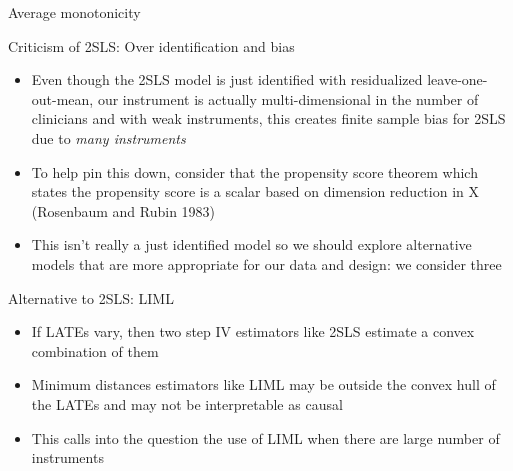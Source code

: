 \documentclass{beamer}
\begin{document}
\begin{frame}[shrink=20]{Average monotonicity}

  

\end{frame}


\begin{frame}{Criticism of 2SLS: Over identification and bias}

  \begin{itemize}
    \item Even though the 2SLS model is just identified with residualized leave-one-out-mean, our instrument is actually multi-dimensional in the number of clinicians and with weak instruments, this creates finite sample bias for 2SLS due to \emph{many instruments}

    \item To help pin this down, consider that the propensity score theorem which states the propensity score is a scalar based on dimension reduction in X (Rosenbaum and Rubin 1983)

    \item This isn't really a just identified model so we should explore alternative models that are more appropriate for our data and design: we consider three
  \end{itemize}

\end{frame}


\begin{frame}{Alternative to 2SLS: LIML}

  \begin{itemize}
    \item If LATEs vary, then two step IV estimators like 2SLS estimate a convex combination of them
    \item Minimum distances estimators like LIML may be outside the convex hull of the LATEs and may not be interpretable as causal
    \item This calls into the question the use of LIML when there are large number of instruments
  \end{itemize}

\end{frame}
\end{document}
